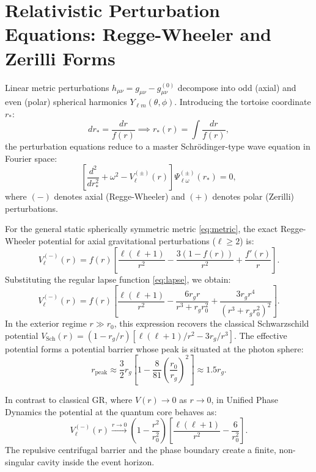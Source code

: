 \documentclass[11pt,a4paper]{article}
\begin{document}
\section{Relativistic Perturbation Equations: Regge-Wheeler and Zerilli Forms}

Linear metric perturbations $h_{\mu\nu} = g_{\mu\nu} - g_{\mu\nu}^{(0)}$ decompose into odd (axial) and even (polar) spherical harmonics $Y_{\ell m}(\theta, \phi)$. Introducing the tortoise coordinate $r_*$:
\begin{equation}
dr_* = \frac{dr}{f(r)} \implies r_*(r) = \int \frac{dr}{f(r)},
\label{eq:tortoise}
\end{equation}
the perturbation equations reduce to a master Schr\"odinger-type wave equation in Fourier space:
\begin{equation}
\left[ \frac{d^2}{dr_*^2} + \omega^2 - V_{\ell}^{(\pm)}(r) \right] \Psi_{\ell\omega}^{(\pm)}(r_*) = 0,
\label{eq:wave_eq}
\end{equation}
where $(-)$ denotes axial (Regge-Wheeler) and $(+)$ denotes polar (Zerilli) perturbations.

For the general static spherically symmetric metric \eqref{eq:metric}, the exact Regge-Wheeler potential for axial gravitational perturbations ($\ell \ge 2$) is:
\begin{equation}
V_{\ell}^{(-)}(r) = f(r) \left[ \frac{\ell(\ell+1)}{r^2} - \frac{3(1 - f(r))}{r^2} + \frac{f'(r)}{r} \right].
\label{eq:V_RW}
\end{equation}
Substituting the regular lapse function \eqref{eq:lapse}, we obtain:
\begin{equation}
V_{\ell}^{(-)}(r) = f(r) \left[ \frac{\ell(\ell+1)}{r^2} - \frac{6 r_g r}{r^3 + r_g r_0^2} + \frac{3 r_g r^4}{(r^3 + r_g r_0^2)^2} \right].
\end{equation}
In the exterior regime $r \gg r_0$, this expression recovers the classical Schwarzschild potential $V_{\mathrm{Sch}}(r) = (1 - r_g/r) [\ell(\ell+1)/r^2 - 3 r_g/r^3]$. The effective potential forms a potential barrier whose peak is situated at the photon sphere:
\begin{equation}
r_{\mathrm{peak}} \approx \frac{3}{2} r_g \left[ 1 - \frac{8}{81} \left(\frac{r_0}{r_g}\right)^2 \right] \approx 1.5 r_g.
\end{equation}

In contrast to classical GR, where $V(r) \to 0$ as $r \to 0$, in Unified Phase Dynamics the potential at the quantum core behaves as:
\begin{equation}
V_{\ell}^{(-)}(r) \xrightarrow{r \to 0} \left( 1 - \frac{r^2}{r_0^2} \right) \left[ \frac{\ell(\ell+1)}{r^2} - \frac{6}{r_0^2} \right].
\end{equation}
The repulsive centrifugal barrier and the phase boundary create a finite, non-singular cavity inside the event horizon.
\end{document}
